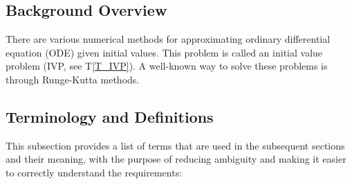 \documentclass[12pt]{article}
\newcommand{\tref}[1]{T\ref{#1}}
\begin{document}
\subsection{Background Overview} \label{Sec_Background}

There are various numerical methods for approximating ordinary differential 
equation (ODE) given initial values. This problem is called an initial value 
problem (IVP, see \tref{T_IVP}). A well-known way to solve these problems is 
through Runge-Kutta methods.%

\subsection{Terminology and  Definitions}

This subsection provides a list of terms that are used in the subsequent
sections and their meaning, with the purpose of reducing ambiguity and making it
easier to correctly understand the requirements:
\end{document}
